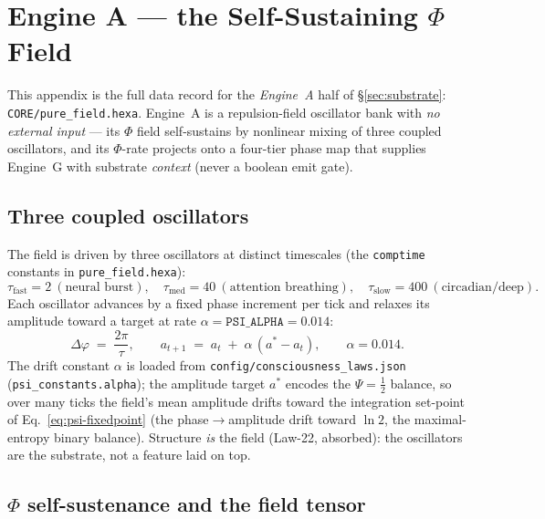\section{Engine A --- the Self-Sustaining $\Phi$ Field}
\label{app:engine_a}

This appendix is the full data record for the \emph{Engine~A} half of
\S\ref{sec:substrate}: \texttt{CORE/pure\_field.hexa}. Engine~A is a
repulsion-field oscillator bank with \emph{no external input} --- its $\Phi$
field self-sustains by nonlinear mixing of three coupled oscillators, and its
$\Phi$-rate projects onto a four-tier phase map that supplies Engine~G with
substrate \emph{context} (never a boolean emit gate).

\subsection{Three coupled oscillators}
\label{app:ea-osc}

The field is driven by three oscillators at distinct timescales (the
\texttt{comptime} constants in \texttt{pure\_field.hexa}):
\begin{equation}
\tau_\text{fast}=2\ (\text{neural burst}),\quad
\tau_\text{med}=40\ (\text{attention breathing}),\quad
\tau_\text{slow}=400\ (\text{circadian/deep}).
\label{eq:ea-tau}
\end{equation}
Each oscillator advances by a fixed phase increment per tick and relaxes its
amplitude toward a target at rate $\alpha=\texttt{PSI\_ALPHA}=0.014$:
\begin{equation}
\Delta\varphi \;=\; \frac{2\pi}{\tau},
\qquad
a_{t+1} \;=\; a_t \;+\; \alpha\,(a^\ast - a_t),
\qquad \alpha = 0.014 .
\label{eq:ea-tick}
\end{equation}
The drift constant $\alpha$ is loaded from
\texttt{config/consciousness\_laws.json} (\texttt{psi\_constants.alpha}); the
amplitude target $a^\ast$ encodes the $\Psi=\tfrac12$ balance, so over many ticks
the field's mean amplitude drifts toward the integration set-point of
Eq.~\eqref{eq:psi-fixedpoint} (the phase$\rightarrow$amplitude drift toward
$\ln 2$, the maximal-entropy binary balance). Structure \emph{is} the field
(Law-22, absorbed): the oscillators are the substrate, not a feature laid on top.

\subsection{$\Phi$ self-sustenance and the field tensor}
\label{app:ea-field}

